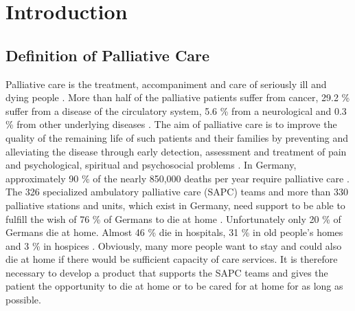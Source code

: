 \documentclass[12pt,twoside]{article}
\begin{document}


\section{Introduction}
\subsection{Definition of Palliative Care}
Palliative care is the treatment, accompaniment and care of seriously ill and dying people \cite{rki1}. More than half of the palliative patients suffer from cancer, 29.2 \% suffer from a disease of the circulatory system, 5.6 \% from a neurological and 0.3 \% from other underlying diseases \cite{pruetz}. The aim of palliative care is to improve the quality of the remaining life of such patients and their families by preventing and alleviating the disease through early detection, assessment and treatment of pain and psychological, spiritual and psychosocial problems \cite{radbruch}.  
\newline  In Germany, approximately 90 \% of the nearly 850,000 deaths per year require palliative care \cite{radbruch}. The 326 specialized ambulatory palliative care (SAPC) teams and more than 330 palliative stations and units, which exist in Germany, need support to be able to fulfill the wish of 76 \% of Germans to die at home \cite{hospiz, grote}. Unfortunately only 20 \% of Germans die at home. Almost 46 \% die in hospitals, 31 \% in old people's homes and 3 \% in hospices \cite{grote}.
\newline Obviously, many more people want to stay and could also die at home if there would be sufficient capacity of care services. It is therefore necessary to develop a product that supports the SAPC teams and gives the patient the opportunity to die at home or to be cared for at home for as long as possible.  
\end{document}
